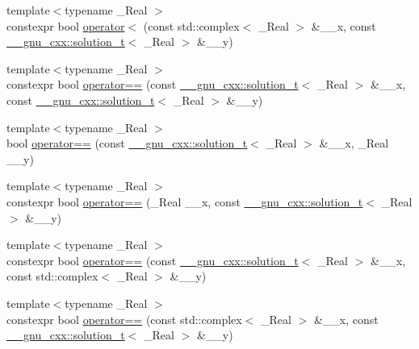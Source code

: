 \begin{DoxyCompactItemize}
\item 
{\footnotesize template$<$typename \+\_\+\+Real $>$ }\\constexpr bool \hyperlink{namespacestd_a907778dd7263e96c120e62cc0901dde9}{operator$<$} (const std\+::complex$<$ \+\_\+\+Real $>$ \&\+\_\+\+\_\+x, const \hyperlink{namespace____gnu__cxx_ae20ea642de50eb361074c62676b0159c}{\+\_\+\+\_\+gnu\+\_\+cxx\+::solution\+\_\+t}$<$ \+\_\+\+Real $>$ \&\+\_\+\+\_\+y)
\item 
{\footnotesize template$<$typename \+\_\+\+Real $>$ }\\constexpr bool \hyperlink{namespacestd_aeae8446ca6e32925d681634d5db05780}{operator==} (const \hyperlink{namespace____gnu__cxx_ae20ea642de50eb361074c62676b0159c}{\+\_\+\+\_\+gnu\+\_\+cxx\+::solution\+\_\+t}$<$ \+\_\+\+Real $>$ \&\+\_\+\+\_\+x, const \hyperlink{namespace____gnu__cxx_ae20ea642de50eb361074c62676b0159c}{\+\_\+\+\_\+gnu\+\_\+cxx\+::solution\+\_\+t}$<$ \+\_\+\+Real $>$ \&\+\_\+\+\_\+y)
\item 
{\footnotesize template$<$typename \+\_\+\+Real $>$ }\\bool \hyperlink{namespacestd_a08af35ce00cff32a8b0a06b87d63f158}{operator==} (const \hyperlink{namespace____gnu__cxx_ae20ea642de50eb361074c62676b0159c}{\+\_\+\+\_\+gnu\+\_\+cxx\+::solution\+\_\+t}$<$ \+\_\+\+Real $>$ \&\+\_\+\+\_\+x, \+\_\+\+Real \+\_\+\+\_\+y)
\item 
{\footnotesize template$<$typename \+\_\+\+Real $>$ }\\constexpr bool \hyperlink{namespacestd_ae5dda4ad56d172c7d64f58b465e3c5c2}{operator==} (\+\_\+\+Real \+\_\+\+\_\+x, const \hyperlink{namespace____gnu__cxx_ae20ea642de50eb361074c62676b0159c}{\+\_\+\+\_\+gnu\+\_\+cxx\+::solution\+\_\+t}$<$ \+\_\+\+Real $>$ \&\+\_\+\+\_\+y)
\item 
{\footnotesize template$<$typename \+\_\+\+Real $>$ }\\constexpr bool \hyperlink{namespacestd_a7c9ad0c2dd7b387d13d1c5efead8a864}{operator==} (const \hyperlink{namespace____gnu__cxx_ae20ea642de50eb361074c62676b0159c}{\+\_\+\+\_\+gnu\+\_\+cxx\+::solution\+\_\+t}$<$ \+\_\+\+Real $>$ \&\+\_\+\+\_\+x, const std\+::complex$<$ \+\_\+\+Real $>$ \&\+\_\+\+\_\+y)
\item 
{\footnotesize template$<$typename \+\_\+\+Real $>$ }\\constexpr bool \hyperlink{namespacestd_a79924b566476ed02b0e085744a838d4c}{operator==} (const std\+::complex$<$ \+\_\+\+Real $>$ \&\+\_\+\+\_\+x, const \hyperlink{namespace____gnu__cxx_ae20ea642de50eb361074c62676b0159c}{\+\_\+\+\_\+gnu\+\_\+cxx\+::solution\+\_\+t}$<$ \+\_\+\+Real $>$ \&\+\_\+\+\_\+y)
\end{DoxyCompactItemize}


